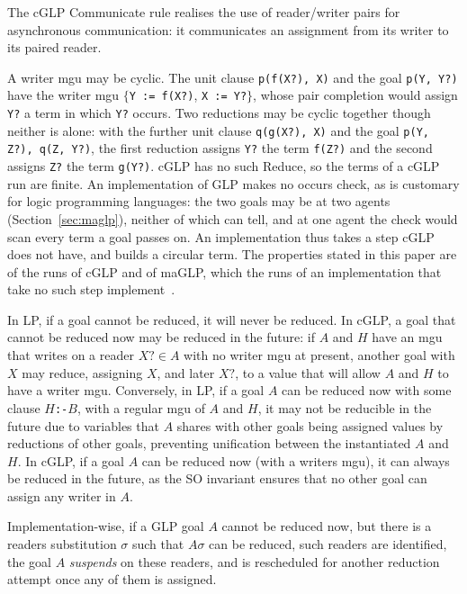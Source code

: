 The cGLP Communicate rule realises the use of reader/writer pairs for asynchronous communication: it communicates an assignment from its writer to its paired reader.

A writer mgu may be cyclic. The unit clause \verb|p(f(X?), X)| and the goal \verb|p(Y, Y?)| have the writer mgu $\{$\verb|Y := f(X?)|, \verb|X := Y?|$\}$, whose pair completion would assign \verb|Y?| a term in which \verb|Y?| occurs. Two reductions may be cyclic together though neither is alone: with the further unit clause \verb|q(g(X?), X)| and the goal \verb|p(Y, Z?), q(Z, Y?)|, the first reduction assigns \verb|Y?| the term \verb|f(Z?)| and the second assigns \verb|Z?| the term \verb|g(Y?)|. cGLP has no such Reduce, so the terms of a cGLP run are finite. An implementation of GLP makes no occurs check, as is customary for logic programming languages: the two goals may be at two agents (Section~\ref{sec:maglp}), neither of which can tell, and at one agent the check would scan every term a goal passes on. An implementation thus takes a step cGLP does not have, and builds a circular term. The properties stated in this paper are of the runs of cGLP and of maGLP, which the runs of an implementation that take no such step implement~\cite{shapiro2026implementing}.


In LP, if a goal cannot be reduced, it will never be reduced. In cGLP, a goal that cannot be reduced now may be reduced in the future: if $A$ and $H$ have an mgu that writes on a reader $X? \in A$ with no writer mgu at present,  another goal with $X$ may reduce, assigning $X$, and later $X?$, to a value that will allow $A$ and $H$ to have a writer mgu. Conversely, in LP, if a goal $A$ can be reduced now with some clause $H$\verb|:-|$B$, with a regular mgu of $A$ and $H$, it may not be reducible in the future due to variables that $A$ shares with other goals being assigned values by reductions of other goals, preventing unification between the instantiated $A$ and $H$. In cGLP, if a goal $A$ can be reduced now (with a writers mgu), it can always be reduced in the future, as the SO invariant ensures that no other goal can assign any writer in $A$.

Implementation-wise, if a GLP goal $A$ cannot be reduced now, but there is a readers substitution $\sigma$ such that $A\sigma$ can be reduced, such readers are identified, the goal $A$ \emph{suspends} on these readers, and is rescheduled for another reduction attempt once any of them is assigned.

